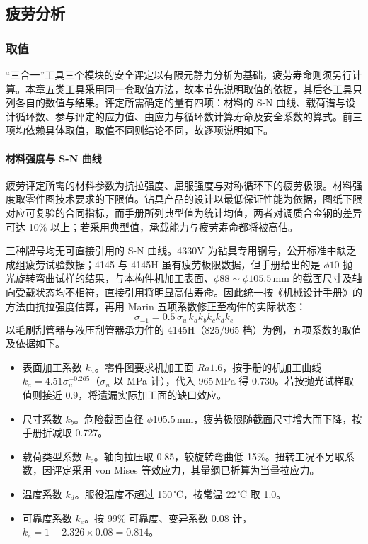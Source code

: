 \subsection{疲劳分析}
\label{sec:fatigue-3in1}

\subsubsection{取值}

“三合一”工具三个模块的安全评定以有限元静力分析为基础，疲劳寿命则须另行计算。本章五类工具采用同一套取值方法，故本节先说明取值的依据，其后各工具只列各自的数值与结果。评定所需确定的量有四项：材料的 S-N 曲线、载荷谱与设计循环数、参与评定的应力值、由应力与循环数计算寿命及安全系数的算式。前三项均依赖具体取值，取值不同则结论不同，故逐项说明如下。

\paragraph{材料强度与 S-N 曲线}
疲劳评定所需的材料参数为抗拉强度、屈服强度与对称循环下的疲劳极限。材料强度取零件图技术要求的下限值。钻具产品的设计以最低保证性能为依据，图纸下限对应可复验的合同指标，而手册所列典型值为统计均值，两者对调质合金钢的差异可达 10\% 以上；若采用典型值，承载能力与疲劳寿命都将被高估。

三种牌号均无可直接引用的 S-N 曲线。4330V 为钻具专用钢号，公开标准中缺乏成组疲劳试验数据；4145 与 4145H 虽有疲劳极限数据，但手册给出的是 $\phi10$ 抛光旋转弯曲试样的结果，与本构件机加工表面、$\phi88\sim\phi105.5$\,mm 的截面尺寸及轴向受载状态均不相符，直接引用将明显高估寿命。因此统一按《机械设计手册》的方法由抗拉强度估算，再用 Marin 五项系数修正至构件的实际状态：
\begin{equation}
\sigma_{-1}=0.5\,\sigma_u\,k_a k_b k_c k_d k_e
\label{eq:marin}
\end{equation}
以毛刷刮管器与液压刮管器承力件的 4145H（825/965 档）为例，五项系数的取值及依据如下。

\begin{itemize}
	\item 表面加工系数 $k_a$。零件图要求机加工面 $Ra1.6$，按手册的机加工曲线 $k_a=4.51\sigma_u^{-0.265}$（$\sigma_u$ 以 MPa 计），代入 965\,MPa 得 0.730。若按抛光试样取值则接近 0.9，将遗漏实际加工面的缺口效应。
	\item 尺寸系数 $k_b$。危险截面直径 $\phi105.5$\,mm，疲劳极限随截面尺寸增大而下降，按手册折减取 0.727。
	\item 载荷类型系数 $k_c$。轴向拉压取 0.85，较旋转弯曲低 15\%。扭转工况不另取系数，因评定采用 von Mises 等效应力，其量纲已折算为当量拉应力。
	\item 温度系数 $k_d$。服役温度不超过 150\,℃，按常温 22\,℃ 取 1.0。
	\item 可靠度系数 $k_e$。按 99\% 可靠度、变异系数 0.08 计，$k_e=1-2.326\times0.08=0.814$。
\end{itemize}

